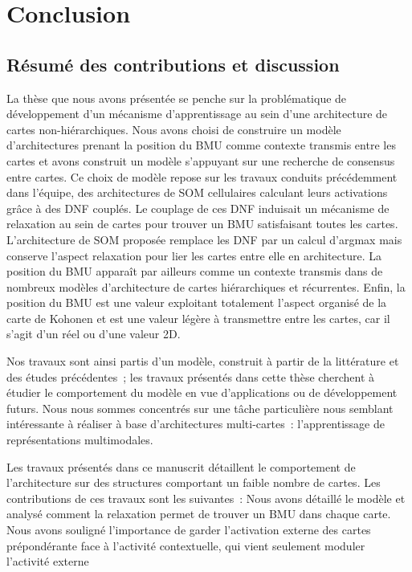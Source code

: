 \chapter*{Conclusion}

\section*{Résumé des contributions et discussion}

La thèse que nous avons présentée se penche sur la problématique de développement d'un mécanisme d'apprentissage au sein d'une architecture de cartes non-hiérarchiques.
Nous avons choisi de construire un modèle d'architectures prenant la position du BMU comme contexte transmis entre les cartes et avons construit un modèle s'appuyant sur une recherche de consensus entre cartes. 
Ce choix de modèle repose sur les travaux conduits précédemment dans l'équipe, des architectures de SOM cellulaires calculant leurs activations grâce à des DNF couplés. 
Le couplage de ces DNF induisait un mécanisme de relaxation au sein de cartes pour trouver un BMU satisfaisant toutes les cartes. L'architecture de SOM proposée remplace les DNF par un calcul d'argmax mais conserve l'aspect relaxation pour lier les cartes entre elle en architecture. La position du BMU apparaît par ailleurs comme un contexte transmis dans de nombreux modèles d'architecture de cartes hiérarchiques et récurrentes. Enfin, la position du BMU est une valeur exploitant totalement l'aspect organisé de la carte de Kohonen et est une valeur légère à transmettre entre les cartes, car il s'agit d'un réel ou d'une valeur 2D.

Nos travaux sont ainsi partis d'un modèle, construit à partir de la littérature et des études précédentes~; les travaux présentés dans cette thèse cherchent à étudier le comportement du modèle en vue d'applications ou de développement futurs.
Nous nous sommes concentrés sur une tâche particulière nous semblant intéressante à réaliser à base d'architectures multi-cartes~: l'apprentissage de représentations multimodales.

Les travaux présentés dans ce manuscrit détaillent le comportement de l'architecture sur des structures comportant un faible nombre de cartes.
Les contributions de ces travaux sont les suivantes~: 
Nous avons détaillé le modèle et analysé comment la relaxation permet de trouver un BMU dans chaque carte. Nous avons souligné l'importance de garder l'activation externe des cartes prépondérante face à l'activité contextuelle, qui vient seulement moduler l'activité externe

